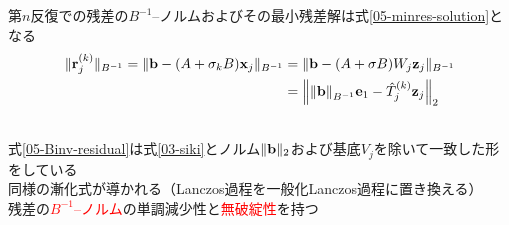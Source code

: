

第$n$反復での残差の$B^{-1}$--ノルムおよびその最小残差解は式\eqref{05-minres-solution}となる
\begin{align}
	\|\vb{r}_{j}^{(k)}\|_{B^{-1}} = \|\vb{b} - (A + \sigma_{k}B)\vb{x}_{j}\|_{B^{-1}}
		&= \|\vb{b} - (A + \sigma B)W_{j}\vb{z}_{j} \|_{B^{-1}} \notag \\
		&= \left\| \norm{\vb{b}}_{B^{-1}}\vb{e}_1 - \hat{T}_{j}^{(k)} \vb{z}_{j} \right\|_2
		\label{05-Binv-residual}\\
	&\hspace*{-17.5cm}\Rightarrow \ \vb{x}_{n}^{(k)} = \|\vb{b}\|_{B^{-1}} W_{j} R_{j}^{-1} Q_{j}^{\htop} \vb{e}_1
	\label{05-minres-solution}
\end{align}
式\eqref{05-Binv-residual}は式\eqref{03-siki}とノルム$\|\vb{b}\|_2$および基底$V_{j}$を除いて一致した形をしている\\
\myitem 同様の漸化式が導かれる（Lanczos過程を一般化Lanczos過程に置き換える）\\
\myitem 残差の\textcolor{red}{$B^{-1}$--ノルム}の単調減少性と\textcolor{red}{無破綻性}を持つ